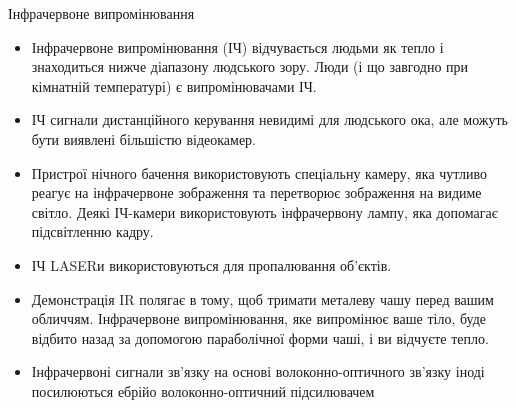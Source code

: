 {\Large Інфрачервоне випромінювання}
\begin{itemize}

\item Інфрачервоне випромінювання (ІЧ) відчувається людьми як тепло і знаходиться нижче діапазону людського зору. Люди (і що завгодно при кімнатній температурі) є випромінювачами ІЧ.

\item ІЧ сигнали дистанційного керування невидимі для людського ока, але можуть бути виявлені більшістю відеокамер.

\item Пристрої нічного бачення використовують спеціальну камеру, яка чутливо реагує на інфрачервоне зображення та перетворює зображення на видиме світло. Деякі ІЧ-камери використовують інфрачервону лампу, яка допомагає підсвітленню кадру.

\item ІЧ LASERи використовуються для пропалювання об'єктів.

\item Демонстрація IR полягає в тому, щоб тримати металеву чашу перед вашим обличчям. Інфрачервоне випромінювання, яке випромінює ваше тіло, буде відбито назад за допомогою параболічної форми чаші, і ви відчуєте тепло.

\item Інфрачервоні сигнали зв'язку на основі волоконно-оптичного зв'язку іноді посилюються ебрійо волоконно-оптичний підсилювачем  
\end{itemize}
